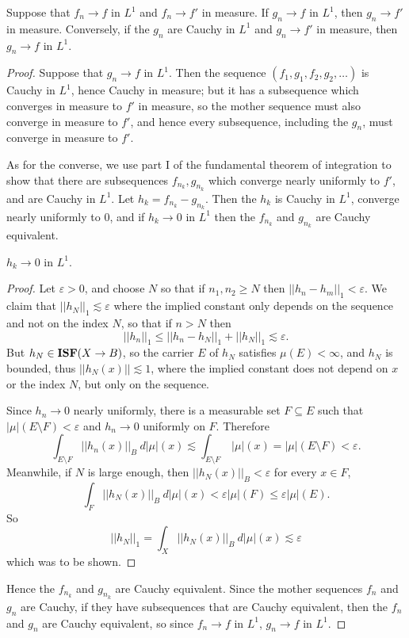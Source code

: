 \begin{theorem}
Suppose that $f_n \to f$ in $L^1$ and $f_n \to f'$ in measure.
If $g_n \to f$ in $L^1$, then $g_n \to f'$ in measure.
Conversely, if the $g_n$ are Cauchy in $L^1$ and $g_n \to f'$ in measure, then $g_n \to f$ in $L^1$.
\end{theorem}
\begin{proof}
Suppose that $g_n \to f$ in $L^1$.
Then the sequence $(f_1, g_1, f_2, g_2, \dots)$ is Cauchy in $L^1$, hence Cauchy in measure; but it has a subsequence which converges in measure to $f'$ in measure, so the mother sequence must also converge in measure to $f'$, and hence every subsequence, including the $g_n$, must converge in measure to $f'$.

As for the converse, we use part I of the fundamental theorem of integration to show that there are subsequences $f_{n_k}, g_{n_k}$ which converge nearly uniformly to $f'$, and are Cauchy in $L^1$.
Let $h_k = f_{n_k} - g_{n_k}$. Then the $h_k$ is Cauchy in $L^1$, converge nearly uniformly to $0$, and if $h_k \to 0$ in $L^1$ then the $f_{n_k}$ and $g_{n_k}$ are Cauchy equivalent.
\begin{lemma}
$h_k \to 0$ in $L^1$.
\end{lemma}
\begin{proof}
Let $\varepsilon > 0$, and choose $N$ so that if $n_1, n_2 \geq N$ then $||h_n - h_m||_1 < \varepsilon$. We claim that $||h_N||_1 \lesssim \varepsilon$ where the implied constant only depends on the sequence and not on the index $N$, so that if $n > N$ then
$$||h_n||_1 \leq ||h_n - h_N||_1 + ||h_N||_1 \lesssim \varepsilon.$$
But $h_N \in \mathbf{ISF}(X \to B)$, so the carrier $E$ of $h_N$ satisfies $\mu(E) < \infty$, and $h_N$ is bounded, thus $||h_N(x)|| \lesssim 1$, where the implied constant does not depend on $x$ or the index $N$, but only on the sequence.

Since $h_n \to 0$ nearly uniformly, there is a measurable set $F \subseteq E$ such that $|\mu|(E \setminus F) < \varepsilon$ and $h_n \to 0$ uniformly on $F$. Therefore
$$\int_{E \setminus F} ||h_n(x)||_B ~d|\mu|(x) \lesssim \int_{E \setminus F} ~|\mu|(x) = |\mu|(E \setminus F) < \varepsilon.$$
Meanwhile, if $N$ is large enough, then $||h_N(x)||_B < \varepsilon$ for every $x \in F$,
$$\int_F ||h_N(x)||_B~d|\mu|(x) < \varepsilon |\mu|(F) \leq \varepsilon |\mu|(E).$$
So
$$||h_N||_1 = \int_X ||h_N(x)||_B ~d|\mu|(x) \lesssim \varepsilon$$
which was to be shown.
\end{proof}

Hence the $f_{n_k}$ and $g_{n_k}$ are Cauchy equivalent.
Since the mother sequences $f_n$ and $g_n$ are Cauchy, if they have subsequences that are Cauchy equivalent, then the $f_n$ and $g_n$ are Cauchy equivalent, so since $f_n \to f$ in $L^1$, $g_n \to f$ in $L^1$.
\end{proof}

